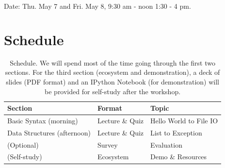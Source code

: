 \documentclass{tufte-handout}
\begin{document}
\noindent Date: Thu. May 7 and Fri. May 8, 9:30 am - noon 1:30 - 4
pm.

\section{Schedule}\label{sec:schedule}
\begin{table}[ht]
  \selectfont
  \begin{tabular}{lll}
    \toprule
    Section & Format & Topic \\
    \midrule
    Basic Syntax (morning) & Lecture \& Quiz & Hello World to File IO \\
    Data Structures (afternoon) & Lecture \& Quiz & List to Exception \\
    (Optional) & Survey & Evaluation \\
    (Self-study) & Ecosystem & Demo \& Resources \\
    \bottomrule
  \end{tabular}
  \caption{Schedule. 
    We will spend most of the time going through the first two
    sections. For the third section (ecosystem and demonstration),
    a deck of slides (PDF format) and an IPython Notebook (for
    demonstration) will be provided for self-study after the workshop.}
  \label{tab:Schedule}
\end{table}
\end{document}

